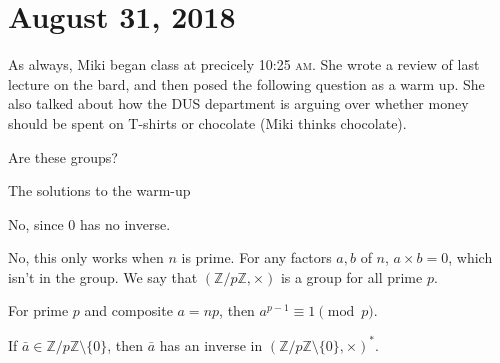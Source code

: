 \section{August 31, 2018}

As always, Miki began class at precicely 10:25 \textsc{am}. She wrote a review of last lecture on the bard, and then posed the following question as a warm up. She also talked about how the DUS department is arguing over whether money should be spent on T-shirts or chocolate (Miki thinks chocolate).

\begin{problem}[Warm Up]
Are these groups?
\end{problem}

\begin{solution}
The solutions to the warm-up
\begin{subproof}
No, since $0$ has no inverse.
\end{subproof}

\begin{subproof}
No, this only works when $n$ is prime. For any factors $a,b$ of $n$, $a \times b = 0$, which isn't in the group. We say that $(\mathbb{Z}/p\mathbb{Z}, \times)$ is a group for all prime $p$.
\end{subproof}
\end{solution}

\begin{theorem}
For prime $p$ and composite $a = np$, then $a^{p-1} \equiv 1 \pmod{p}$. 
\end{theorem}

\begin{lemma}
If $\bar{a} \in \mathbb{Z}/p\mathbb{Z} \setminus \{0\}$, then $\bar{a}$ has an inverse in $(\mathbb{Z}/p\mathbb{Z} \setminus \{0\}, \times)^*$.
\end{lemma}

